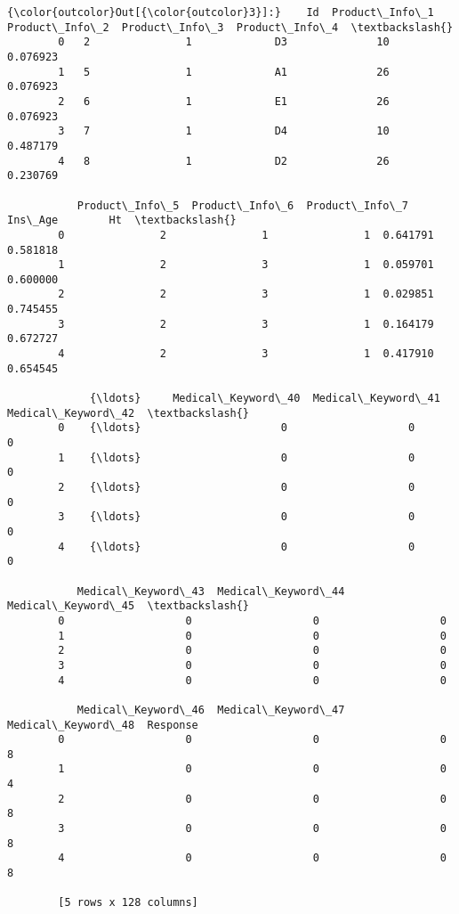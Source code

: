 \documentclass[11pt]{article}
\begin{document}
\begin{Verbatim}[commandchars=\\\{\}]
{\color{outcolor}Out[{\color{outcolor}3}]:}    Id  Product\_Info\_1 Product\_Info\_2  Product\_Info\_3  Product\_Info\_4  \textbackslash{}
        0   2               1             D3              10        0.076923   
        1   5               1             A1              26        0.076923   
        2   6               1             E1              26        0.076923   
        3   7               1             D4              10        0.487179   
        4   8               1             D2              26        0.230769   
        
           Product\_Info\_5  Product\_Info\_6  Product\_Info\_7   Ins\_Age        Ht  \textbackslash{}
        0               2               1               1  0.641791  0.581818   
        1               2               3               1  0.059701  0.600000   
        2               2               3               1  0.029851  0.745455   
        3               2               3               1  0.164179  0.672727   
        4               2               3               1  0.417910  0.654545   
        
             {\ldots}     Medical\_Keyword\_40  Medical\_Keyword\_41  Medical\_Keyword\_42  \textbackslash{}
        0    {\ldots}                      0                   0                   0   
        1    {\ldots}                      0                   0                   0   
        2    {\ldots}                      0                   0                   0   
        3    {\ldots}                      0                   0                   0   
        4    {\ldots}                      0                   0                   0   
        
           Medical\_Keyword\_43  Medical\_Keyword\_44  Medical\_Keyword\_45  \textbackslash{}
        0                   0                   0                   0   
        1                   0                   0                   0   
        2                   0                   0                   0   
        3                   0                   0                   0   
        4                   0                   0                   0   
        
           Medical\_Keyword\_46  Medical\_Keyword\_47  Medical\_Keyword\_48  Response  
        0                   0                   0                   0         8  
        1                   0                   0                   0         4  
        2                   0                   0                   0         8  
        3                   0                   0                   0         8  
        4                   0                   0                   0         8  
        
        [5 rows x 128 columns]
\end{Verbatim}
            
\end{document}
